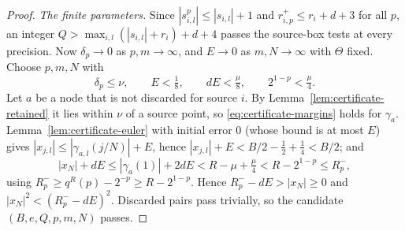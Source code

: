 \begin{proof}
\emph{The finite parameters.} Since $|s^p_{i,l}|\le|s_{i,l}|+1$ and $r^+_{i,p}\le r_i+d+3$ for all $p$, an integer
$Q>\max_{i,l}(|s_{i,l}|+r_i)+d+4$ passes the source-box tests at every precision. Now $\delta_p\to0$ as
$p,m\to\infty$, and $E\to0$ as $m,N\to\infty$ with $\Theta$ fixed. Choose $p,m,N$ with
\[
 \delta_p\le\nu,\qquad E<\tfrac18,\qquad dE<\tfrac\mu8,\qquad 2^{1-p}<\tfrac\mu4 .
\]
Let $a$ be a node that is not discarded for source $i$. By Lemma~\ref{lem:certificate-retained} it lies within
$\nu$ of a source point, so \eqref{eq:certificate-margins} holds for $\gamma_a$. Lemma~\ref{lem:certificate-euler} with
initial error $0$ (whose bound is at most $E$) gives $|x_{j,l}|\le|\gamma_{a,l}(j/N)|+E$, hence
$|x_{j,l}|+E<B/2-\frac12+\frac14<B/2$; and
\[
 |x_N|+dE\le|\gamma_a(1)|+2dE<R-\mu+\tfrac\mu4<R-2^{1-p}\le R^-_p,
\]
using $R^-_p\ge q^R(p)-2^{-p}\ge R-2^{1-p}$. Hence $R^-_p-dE>|x_N|\ge0$ and $|x_N|^2<(R^-_p-dE)^2$. Discarded pairs
pass trivially, so the candidate $(B,e,Q,p,m,N)$ passes.
\end{proof}

